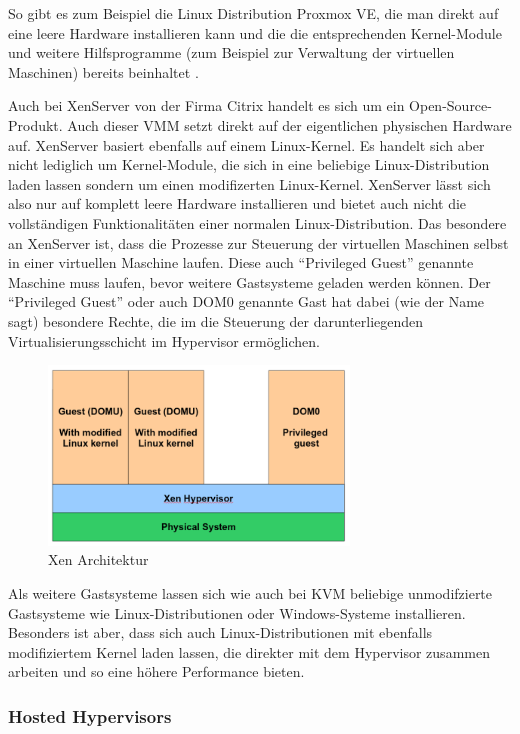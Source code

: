 So gibt es zum Beispiel die Linux Distribution Proxmox VE, die man direkt auf eine leere Hardware installieren kann und die die entsprechenden Kernel-Module und weitere Hilfsprogramme (zum Beispiel zur Verwaltung der virtuellen Maschinen) bereits beinhaltet \citep[Vgl.][]{Proxmox14}.

Auch bei XenServer von der Firma Citrix handelt es sich um ein Open-Source-Produkt. Auch dieser \ac{VMM} setzt direkt auf der eigentlichen physischen Hardware auf. XenServer basiert ebenfalls auf einem Linux-Kernel. Es handelt sich aber nicht lediglich um Kernel-Module, die sich in eine beliebige Linux-Distribution laden lassen sondern um einen modifizerten Linux-Kernel. XenServer lässt sich also nur auf komplett leere Hardware installieren und bietet auch nicht die vollständigen Funktionalitäten einer normalen Linux-Distribution. Das besondere an XenServer ist, dass die Prozesse zur Steuerung der virtuellen Maschinen selbst in einer virtuellen Maschine laufen. Diese auch "`Privileged Guest"' genannte Maschine muss laufen, bevor weitere Gastsysteme geladen werden können. Der "`Privileged Guest"' oder auch DOM0 genannte Gast hat dabei (wie der Name sagt) besondere Rechte, die im die Steuerung der darunterliegenden Virtualisierungsschicht im Hypervisor ermöglichen.

\begin{figure}[!ht]
  \begin{center}
    \includegraphics[width=8cm]{bilder/xen.png}
    \caption{Xen Architektur \citep{kvm:002}}
  \end{center}
\end{figure}

Als weitere Gastsysteme lassen sich wie auch bei KVM beliebige unmodifzierte Gastsysteme wie Linux-Distributionen oder Windows-Systeme installieren. Besonders ist aber, dass sich auch Linux-Distributionen mit ebenfalls modifiziertem Kernel laden lassen, die direkter mit dem Hypervisor zusammen arbeiten und so eine höhere Performance bieten.

\subsubsection{Hosted Hypervisors}


